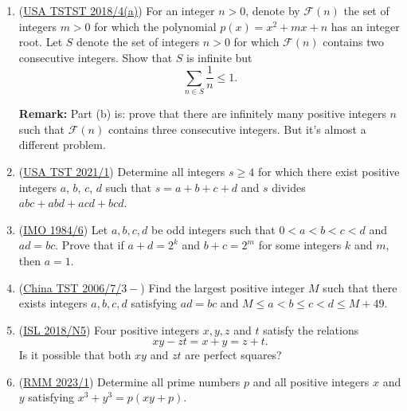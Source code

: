 \documentclass[11pt,paper=letter]{scrartcl}
\begin{document}
\begin{enumerate}[resume]

\item (\href{https://artofproblemsolving.com/community/c6h1664165p10571361}{USA TSTST 2018/4(a)}) For an integer $n > 0$, denote by $\mathcal F(n)$ the set of integers $m > 0$ for which the polynomial $p(x) = x^2 + mx + n$ has an integer root. Let $S$ denote the set of integers $n > 0$ for which $\mathcal F(n)$ contains two consecutive integers. Show that $S$ is infinite but \[ \sum_{n \in S} \frac 1n \le 1. \] \hints{\ref{h:8} \ref{h:9}}

\textbf{Remark:} Part (b) is: prove that there are infinitely many positive integers $n$ such that $\mathcal F(n)$ contains three consecutive integers. But it's almost a different problem.

\item (\href{https://artofproblemsolving.com/community/c6h2470467p20672573}{USA TST 2021/1}) Determine all integers $s \ge 4$ for which there exist positive integers $a$, $b$, $c$, $d$ such that $s = a+b+c+d$ and $s$ divides $abc+abd+acd+bcd$. \hints{\ref{h:10} \ref{h:11}}

\item (\href{https://artofproblemsolving.com/community/c6h26504p165811}{IMO 1984/6}) Let $a,b,c,d$ be odd integers such that $0<a<b<c<d$ and $ad=bc$. Prove that if $a+d=2^k$ and $b+c=2^m$ for some integers $k$ and $m$, then $a=1$. \hints{\ref{h:12} \ref{h:13}}

\item (\href{https://artofproblemsolving.com/community/c6h97507p550638}{China TST 2006/7/$3-$}) Find the largest positive integer $M$ such that there exists integers $a, b, c, d$ satisfying $ad = bc$ and $M \le a < b \le c < d \le M + 49$. \hints{\ref{h:14} \ref{h:15}}

\item (\href{https://artofproblemsolving.com/community/c6h1876761p12752815}{ISL 2018/N5}) Four positive integers $x,y,z$ and $t$ satisfy the relations \[ xy - zt = x + y = z + t. \]Is it possible that both $xy$ and $zt$ are perfect squares? \hints{\ref{h:16} \ref{h:17} \ref{h:18}}

\item (\href{https://artofproblemsolving.com/community/c6h3024159p27195228}{RMM 2023/1}) Determine all prime numbers $p$ and all positive integers $x$ and $y$ satisfying $x^3+y^3=p(xy+p).$ \hints{\ref{h:19} \ref{h:20} \ref{h:21}}

\end{enumerate}
\end{document}
